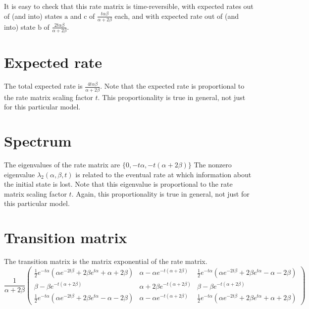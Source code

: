 \documentclass{article}
\providecommand{\Ao}{\text{a}}
\providecommand{\Bo}{\text{b}}
\providecommand{\Co}{\text{c}}
\providecommand{\Pa}{\alpha}
\providecommand{\Pb}{\beta}
\begin{document}
It is easy to check that this rate matrix is time-reversible,
with expected rates out of (and into) states $\Ao$ and $\Co$
of $\frac{t \Pa \Pb}{\Pa + 2 \Pb}$ each,
and with expected rate out of (and into) state $\Bo$
of $\frac{2 t \Pa \Pb}{\Pa + 2 \Pb}$.

\section{Expected rate}

The total expected rate is
$\frac{4 t \Pa \Pb}{\Pa + 2 \Pb}$.
Note that the expected rate is proportional to the rate matrix scaling
factor $t$.
This proportionality is true in general, not just for this particular model.

\section{Spectrum}

The eigenvalues of the rate matrix are
$\{ 0, - t \Pa, - t \left( \Pa + 2 \Pb \right) \}$
The nonzero eigenvalue
$\lambda_2 \left( \Pa, \Pb, t \right)$
is related to the eventual rate
at which information about the initial state is lost.
Note that this eigenvalue is proportional to the rate matrix scaling
factor $t$.
Again, this proportionality is true in general,
not just for this particular model.

\section{Transition matrix}

The transition matrix is the matrix exponential of the rate matrix.
\begin{equation}
	\frac{1}{\Pa + 2 \Pb}
	\begin{pmatrix}
		\frac{1}{2} e^{-t \Pa} \left(
			\Pa e^{-2 t \Pb} + 2 \Pb e^{t \Pa} + \Pa + 2 \Pb
		\right) &
		\Pa - \Pa e^{-t \left( \Pa + 2 \Pb \right)} &
		\frac{1}{2} e^{-t \Pa} \left(
			\Pa e^{-2 t \Pb} + 2 \Pb e^{t \Pa} - \Pa - 2 \Pb
		\right) \\
		\Pb - \Pb e^{ - t \left( \Pa + 2 \Pb \right) } &
		\Pa + 2 \Pb e^{ - t \left( \Pa + 2 \Pb \right) } &
		\Pb - \Pb e^{ - t \left( \Pa + 2 \Pb \right) } \\
		\frac{1}{2} e^{-t \Pa} \left(
			\Pa e^{-2 t \Pb} + 2 \Pb e^{t \Pa} - \Pa - 2 \Pb
		\right) &
		\Pa - \Pa e^{-t \left( \Pa + 2 \Pb \right)} &
		\frac{1}{2} e^{-t \Pa} \left(
			\Pa e^{-2 t \Pb} + 2 \Pb e^{t \Pa} + \Pa + 2 \Pb
		\right)
	\end{pmatrix}
\end{equation}
\end{document}
